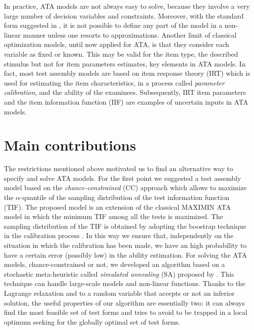 In practice, ATA models are not always easy to solve, because they involve a very large number of decision variables and constraints.
Moreover, with the standard form suggested in \textcite{VDL2005}, it is not possible to define any part of the model in a non-linear manner unless one resorts to approximations.
Another limit of classical optimization models, until now applied for ATA, is that they consider each variable as fixed or known.
This may be valid for the item type, the described stimulus but not for item parameters estimates, key elements in ATA models.
In fact, most test assembly models are based on item response theory (IRT) which is used for estimating the item characteristics, in a process called \emph{parameter calibration}, and the ability of the examinees.
Subsequently, IRT item parameters and the item information function (IIF) are examples of uncertain inputs in ATA models. 

\section{Main contributions}

The restrictions mentioned above motivated us to find an alternative way to specify and solve ATA models. For the first point we suggested a test assembly model based on the \emph{chance-constrained} (CC) approach \parencite[see][]{charnes1958cost} which allows to maximize the $\alpha$-quantile of the sampling distribution of the test information function (TIF). The proposed model is an extension of the classical MAXIMIN ATA model \parencite[][, p.69-70]{VDL2005} in which the minimum TIF among all the tests is maximized. The sampling distribution of the TIF is obtained by adopting the boostrap technique in the calibration process \parencite{efron1993, shao2012}. In this way we ensure that, independently on the situation in which the calibration has been made, we have an high probability to have a certain error (possibly low) in the ability estimation. For solving the ATA models, chance-constrained or not, we developed an algorithm based on a stochastic meta-heuristic called \emph{simulated annealing} (SA) proposed by \textcite{goffe1996simann}. This technique can handle large-scale models and non-linear functions. Thanks to the Lagrange relaxation and to a random variable that accepts or not an inferior solution, the useful properties of our algorithm are essentially two: it can always find the most feasible set of test forms and tries to avoid to be trapped in a local optimum seeking for the globally optimal set of test forms.

